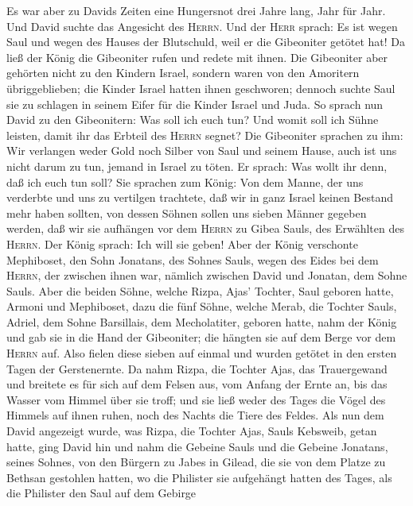  Es war aber zu Davids Zeiten eine Hungersnot drei Jahre
lang, Jahr für Jahr. Und David suchte das Angesicht des \textsc{Herrn}.
Und der \textsc{Herr} sprach: Es ist wegen Saul und wegen des Hauses der
Blutschuld, weil er die Gibeoniter getötet hat!  Da ließ
der König die Gibeoniter rufen und redete mit ihnen. Die Gibeoniter aber
gehörten nicht zu den Kindern Israel, sondern waren von den Amoritern
übriggeblieben; die Kinder Israel hatten ihnen geschworen; dennoch
suchte Saul sie zu schlagen in seinem Eifer für die Kinder Israel und
Juda.  So sprach nun David zu den Gibeonitern: Was soll
ich euch tun? Und womit soll ich Sühne leisten, damit ihr das Erbteil
des \textsc{Herrn} segnet?  Die Gibeoniter sprachen zu
ihm: Wir verlangen weder Gold noch Silber von Saul und seinem Hause,
auch ist uns nicht darum zu tun, jemand in Israel zu töten. Er sprach:
Was wollt ihr denn, daß ich euch tun soll?  Sie sprachen
zum König: Von dem Manne, der uns verderbte und uns zu vertilgen
trachtete, daß wir in ganz Israel keinen Bestand mehr haben sollten,
 von dessen Söhnen sollen uns sieben Männer gegeben
werden, daß wir sie aufhängen vor dem \textsc{Herrn} zu Gibea Sauls, des
Erwählten des \textsc{Herrn}. Der König sprach: Ich will sie geben!
 Aber der König verschonte Mephiboset, den Sohn Jonatans,
des Sohnes Sauls, wegen des Eides bei dem \textsc{Herrn}, der zwischen
ihnen war, nämlich zwischen David und Jonatan, dem Sohne Sauls.
 Aber die beiden Söhne, welche Rizpa, Ajas' Tochter, Saul
geboren hatte, Armoni und Mephiboset, dazu die fünf Söhne, welche Merab,
die Tochter Sauls, Adriel, dem Sohne Barsillais, dem Mecholatiter,
geboren hatte, nahm der König  und gab sie in die Hand der
Gibeoniter; die hängten sie auf dem Berge vor dem \textsc{Herrn} auf.
Also fielen diese sieben auf einmal und wurden getötet in den ersten
Tagen der Gerstenernte.  Da nahm Rizpa, die Tochter Ajas,
das Trauergewand und breitete es für sich auf dem Felsen aus, vom Anfang
der Ernte an, bis das Wasser vom Himmel über sie troff; und sie ließ
weder des Tages die Vögel des Himmels auf ihnen ruhen, noch des Nachts
die Tiere des Feldes.  Als nun dem David angezeigt wurde,
was Rizpa, die Tochter Ajas, Sauls Kebsweib, getan hatte,
 ging David hin und nahm die Gebeine Sauls und die
Gebeine Jonatans, seines Sohnes, von den Bürgern zu Jabes in Gilead, die
sie von dem Platze zu Bethsan gestohlen hatten, wo die Philister sie
aufgehängt hatten des Tages, als die Philister den Saul auf dem Gebirge
